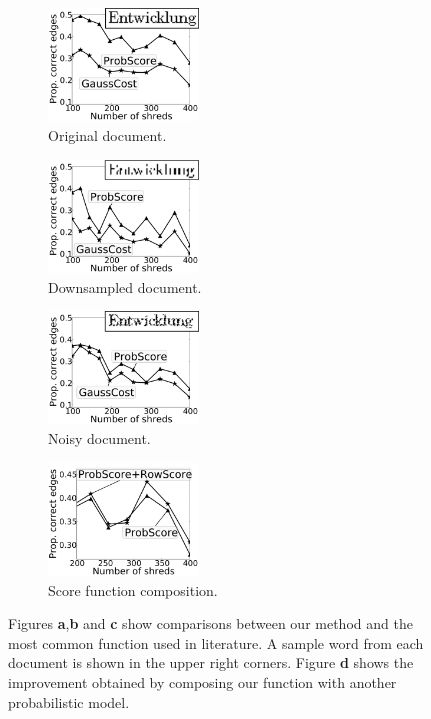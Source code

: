 \documentclass[letterpaper]{article}
\begin{document}
\begin{figure}[h]
    \centering
    \begin{subfigure}[b]{0.23\textwidth}
        \setlength{\abovecaptionskip}{4pt plus 1.0pt minus 2.0pt}
        \centering
        \includegraphics[width=\textwidth,height=3cm,natwidth=610,natheight=642]{origCompBWEnt.jpg}
        \caption{Original document.}
    \end{subfigure}
    \begin{subfigure}[b]{0.23\textwidth}
        \setlength{\abovecaptionskip}{4pt plus 1.0pt minus 2.0pt}
        \centering
        \includegraphics[width=\textwidth,height=3cm,natwidth=610,natheight=642]{downsampleBWEnt.jpg}
        \caption{Downsampled document.}
    \end{subfigure}
    \begin{subfigure}[b]{0.23\textwidth}
        \setlength{\abovecaptionskip}{4pt plus 1.0pt minus 2.0pt}
        \centering
        \includegraphics[width=\textwidth,height=3cm,natwidth=610,natheight=642]{shuffleBWEnt.jpg}
        \caption{Noisy document.}
    \end{subfigure}
    \begin{subfigure}[b]{0.23\textwidth}
        \setlength{\abovecaptionskip}{4pt plus 1.0pt minus 2.0pt}
        \centering
        \includegraphics[width=\textwidth,height=3cm,natwidth=610,natheight=642]{rowCompBW.jpg}
        \caption{Score function composition.}
    \end{subfigure}
     \caption{Figures {\bf a},{\bf b} and {\bf c} show comparisons between our method and the most common function used in literature. A sample word from each document is shown in the upper right corners. Figure {\bf d} shows the improvement obtained by composing our function with another probabilistic model.}
    \label{fig:scoreComp}
\end{figure}
\end{document}
